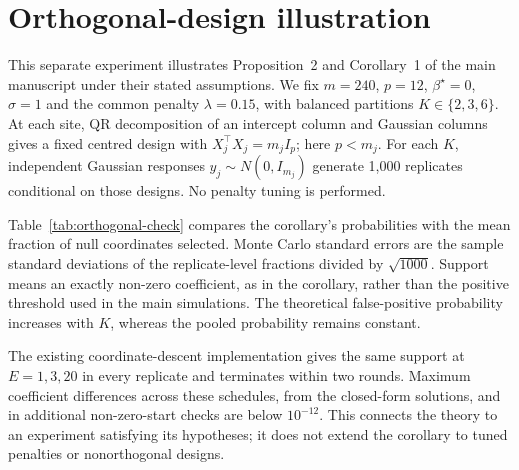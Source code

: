 \section*{Orthogonal-design illustration}
This separate experiment illustrates Proposition~2 and Corollary~1 of the
main manuscript under their stated assumptions. We fix $m=240$, $p=12$,
$\beta^\star=0$, $\sigma=1$ and the common penalty $\lambda=0.15$, with
balanced partitions $K\in\{2,3,6\}$. At each site, QR decomposition of an
intercept column and Gaussian columns gives a fixed centred design with
$X_j^\top X_j=m_j I_p$; here $p<m_j$. For each $K$, independent Gaussian
responses $y_j\sim N(0,I_{m_j})$ generate 1,000 replicates conditional on
those designs. No penalty tuning is performed.

Table~\ref{tab:orthogonal-check} compares the corollary's probabilities
with the mean fraction of null coordinates selected. Monte Carlo standard
errors are the sample standard deviations of the replicate-level
fractions divided by $\sqrt{1000}$. Support means an exactly non-zero
coefficient, as in the corollary, rather than the positive threshold used
in the main simulations. The theoretical false-positive probability
increases with $K$, whereas the pooled probability remains constant.

The existing coordinate-descent implementation gives the same support at
$E=1,3,20$ in every replicate and terminates within two rounds. Maximum
coefficient differences across these schedules, from the closed-form
solutions, and in additional non-zero-start checks are below $10^{-12}$.
This connects the theory to an experiment satisfying its hypotheses; it
does not extend the corollary to tuned penalties or nonorthogonal designs.

